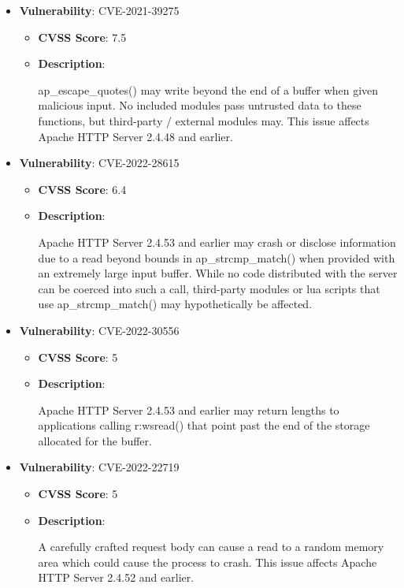 \documentclass{article}
\begin{document}
\begin{itemize}
        \item \textbf{Vulnerability}: CVE-2021-39275
        \begin{itemize}
            \item \textbf{CVSS Score}:  7.5 
            \item \textbf{Description}:
            \parbox[t]{0.9\linewidth}{
                \ttfamily ap\_escape\_quotes() may write beyond the end of a buffer when given malicious input. No included modules pass untrusted data to these functions, but third-party / external modules may. This issue affects Apache HTTP Server 2.4.48 and earlier.
            }
        \end{itemize}
    
        \item \textbf{Vulnerability}: CVE-2022-28615
        \begin{itemize}
            \item \textbf{CVSS Score}:  6.4 
            \item \textbf{Description}:
            \parbox[t]{0.9\linewidth}{
                \ttfamily Apache HTTP Server 2.4.53 and earlier may crash or disclose information due to a read beyond bounds in ap\_strcmp\_match() when provided with an extremely large input buffer. While no code distributed with the server can be coerced into such a call, third-party modules or lua scripts that use ap\_strcmp\_match() may hypothetically be affected.
            }
        \end{itemize}
    
        \item \textbf{Vulnerability}: CVE-2022-30556
        \begin{itemize}
            \item \textbf{CVSS Score}:  5 
            \item \textbf{Description}:
            \parbox[t]{0.9\linewidth}{
                \ttfamily Apache HTTP Server 2.4.53 and earlier may return lengths to applications calling r:wsread() that point past the end of the storage allocated for the buffer.
            }
        \end{itemize}
    
        \item \textbf{Vulnerability}: CVE-2022-22719
        \begin{itemize}
            \item \textbf{CVSS Score}:  5 
            \item \textbf{Description}:
            \parbox[t]{0.9\linewidth}{
                \ttfamily A carefully crafted request body can cause a read to a random memory area which could cause the process to crash. This issue affects Apache HTTP Server 2.4.52 and earlier.
            }
        \end{itemize}
    
\end{itemize}
\end{document}
